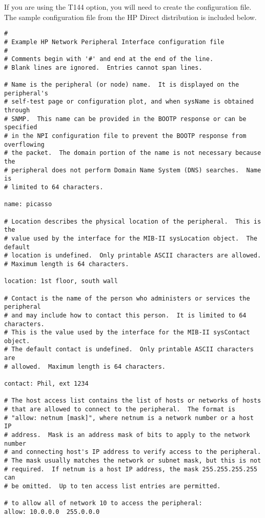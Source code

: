 \documentclass[a4paper]{article}
\begin{document}
If  you  are  using the T144 option, you will need to create
the  configuration file.  The sample configuration file from
the HP Direct distribution is included below.
\begin{tscreen}
\begin{verbatim}
#
# Example HP Network Peripheral Interface configuration file
# 
# Comments begin with '#' and end at the end of the line.
# Blank lines are ignored.  Entries cannot span lines.

# Name is the peripheral (or node) name.  It is displayed on the peripheral's
# self-test page or configuration plot, and when sysName is obtained through
# SNMP.  This name can be provided in the BOOTP response or can be specified
# in the NPI configuration file to prevent the BOOTP response from overflowing
# the packet.  The domain portion of the name is not necessary because the
# peripheral does not perform Domain Name System (DNS) searches.  Name is
# limited to 64 characters.

name: picasso

# Location describes the physical location of the peripheral.  This is the
# value used by the interface for the MIB-II sysLocation object.  The default
# location is undefined.  Only printable ASCII characters are allowed.
# Maximum length is 64 characters.

location: 1st floor, south wall

# Contact is the name of the person who administers or services the peripheral
# and may include how to contact this person.  It is limited to 64 characters.
# This is the value used by the interface for the MIB-II sysContact object.
# The default contact is undefined.  Only printable ASCII characters are
# allowed.  Maximum length is 64 characters.

contact: Phil, ext 1234

# The host access list contains the list of hosts or networks of hosts
# that are allowed to connect to the peripheral.  The format is
# "allow: netnum [mask]", where netnum is a network number or a host IP
# address.  Mask is an address mask of bits to apply to the network number
# and connecting host's IP address to verify access to the peripheral.
# The mask usually matches the network or subnet mask, but this is not
# required.  If netnum is a host IP address, the mask 255.255.255.255 can
# be omitted.  Up to ten access list entries are permitted.

# to allow all of network 10 to access the peripheral:
allow: 10.0.0.0  255.0.0.0


\end{verbatim}
\end{tscreen}
\end{document}
